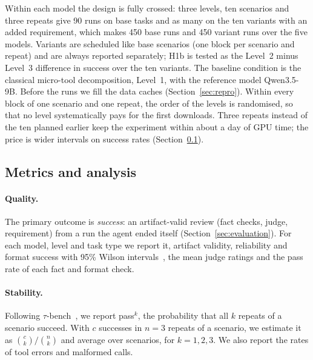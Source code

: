 Within each model the design is fully crossed: three levels, ten scenarios and three repeats give 90 runs on base tasks and as many on the ten variants with an added requirement, which makes 450 base runs and 450 variant runs over the five models. Variants are scheduled like base scenarios (one block per scenario and repeat) and are always reported separately; H1b is tested as the Level~2 minus Level~3 difference in success over the ten variants. The baseline condition is the classical micro-tool decomposition, Level~1, with the reference model Qwen3.5-9B. Before the runs we fill the data caches (Section~\ref{sec:repro}). Within every block of one scenario and one repeat, the order of the levels is randomised, so that no level systematically pays for the first downloads. Three repeats instead of the ten planned earlier keep the experiment within about a day of GPU time; the price is wider intervals on success rates (Section~\ref{sec:analysis}).

\subsection{Metrics and analysis}
\label{sec:analysis}

\paragraph{Quality.} The primary outcome is \emph{success}: an artifact-valid review (fact checks, judge, requirement) from a run the agent ended itself (Section~\ref{sec:evaluation}). For each model, level and task type we report it, artifact validity, reliability and format success with 95\% Wilson intervals~\citep{wilson1927probable}, the mean judge ratings and the pass rate of each fact and format check.

\paragraph{Stability.} Following $\tau$-bench~\citep{yao2024taubench}, we report pass$^k$, the probability that all $k$ repeats of a scenario succeed. With $c$ successes in $n=3$ repeats of a scenario, we estimate it as $\binom{c}{k}/\binom{n}{k}$ and average over scenarios, for $k=1,2,3$. We also report the rates of tool errors and malformed calls.

